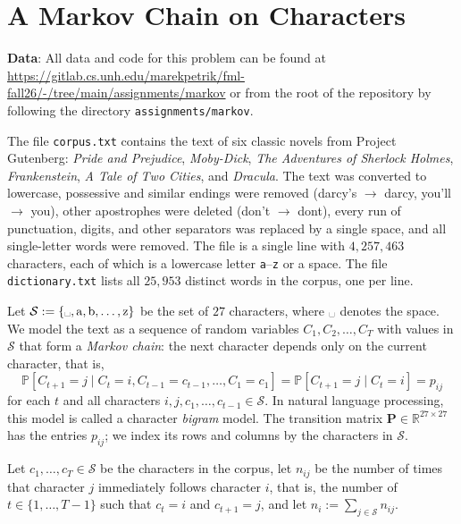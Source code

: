 \documentclass[letterpaper]{article}
\newcommand{\Real}{\mathbb{R}}
\newcommand{\spc}{\text{\textvisiblespace}}
\begin{document}
\section{A Markov Chain on Characters}

\textbf{Data}: All data and code for this problem can be found at \url{https://gitlab.cs.unh.edu/marekpetrik/fml-fall26/-/tree/main/assignments/markov} or from the root of the repository by following the directory \texttt{assignments/markov}.

The file \texttt{corpus.txt} contains the text of six classic novels from Project Gutenberg: \emph{Pride and Prejudice}, \emph{Moby-Dick}, \emph{The Adventures of Sherlock Holmes}, \emph{Frankenstein}, \emph{A Tale of Two Cities}, and \emph{Dracula}. The text was converted to lowercase, possessive and similar endings were removed (darcy's $\to$ darcy, you'll $\to$ you), other apostrophes were deleted (don't $\to$ dont), every run of punctuation, digits, and other separators was replaced by a single space, and all single-letter words were removed. The file is a single line with $4{,}257{,}463$ characters, each of which is a lowercase letter \texttt{a}--\texttt{z} or a space. The file \texttt{dictionary.txt} lists all $25{,}953$ distinct words in the corpus, one per line.

Let $\mathcal{S} := \{\spc, \mathrm{a}, \mathrm{b}, \dots, \mathrm{z}\}$ be the set of $27$ characters, where $\spc$ denotes the space. We model the text as a sequence of random variables $C_1, C_2, \dots, C_T$ with values in $\mathcal{S}$ that form a \emph{Markov chain}: the next character depends only on the current character, that is,
\[
  \mathbb{P}[C_{t+1} = j \mid C_t = i, C_{t-1} = c_{t-1}, \dots, C_1 = c_1] = \mathbb{P}[C_{t+1} = j \mid C_t = i] = p_{ij}
\]
for each $t$ and all characters $i, j, c_1, \dots, c_{t-1} \in \mathcal{S}$. In natural language processing, this model is called a character \emph{bigram} model. The transition matrix $\bm{P} \in \Real^{27 \times 27}$ has the entries $p_{ij}$; we index its rows and columns by the characters in $\mathcal{S}$.

Let $c_1, \dots, c_T \in \mathcal{S}$ be the characters in the corpus, let $n_{ij}$ be the number of times that character $j$ immediately follows character $i$, that is, the number of $t \in \{1, \dots, T-1\}$ such that $c_t = i$ and $c_{t+1} = j$, and let $n_i := \sum_{j \in \mathcal{S}} n_{ij}$.
\end{document}
